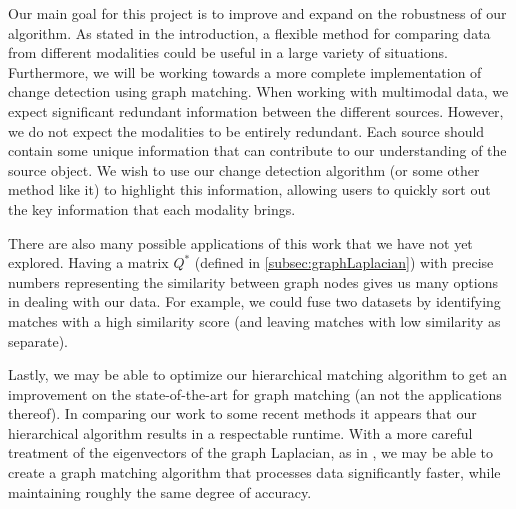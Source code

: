 \documentclass{article}[11pt]
\begin{document}
Our main goal for this project is to improve and expand on the robustness of our
algorithm. As stated in the introduction, a flexible method for comparing data
from different modalities could be useful in a large variety of
situations. Furthermore, we will be working towards a more complete
implementation of change detection using graph matching. When working with
multimodal data, we expect significant redundant information between the
different sources. However, we do not expect the modalities to be entirely
redundant. Each source should contain some unique information that can
contribute to our understanding of the source object. We wish to use our change
detection algorithm (or some other method like it) to highlight this
information, allowing users to quickly sort out the key information that each
modality brings.

There are also many possible applications of this work that we have not yet
explored. Having a matrix $Q^{*}$ (defined in \ref{subsec:graphLaplacian}) with
precise numbers representing the similarity between graph nodes gives us many
options in dealing with our data. For example, we could fuse two datasets by
identifying matches with a high similarity score (and leaving matches with low
similarity as separate). 

Lastly, we may be able to optimize our hierarchical matching algorithm to get an
improvement on the state-of-the-art for graph matching (an not the applications
thereof). In comparing our work to some recent methods
\cite{Knossow2009,211474,Vogelstein2015,NIPS2013_4925,4641936} it appears that
our hierarchical algorithm results in a respectable runtime. With a more careful
treatment of the eigenvectors of the graph Laplacian, as in \cite{Fowlkes04,
  Merkurjev13, Woodworth13}, we may be able to create a graph matching algorithm
that processes data significantly faster, while maintaining roughly the same degree
of accuracy.

 
\end{document}
